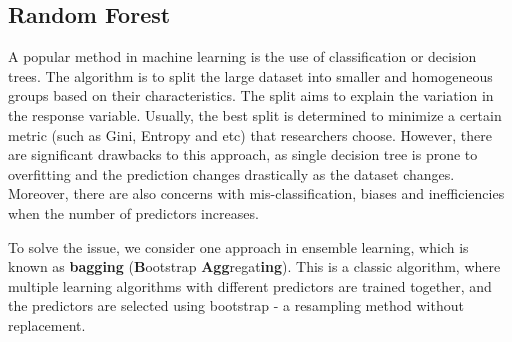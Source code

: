 \documentclass[oneside, 12pt]{article}
\newcommand*{\1}{\text{\scalebox{1.1}{\usefont{U}{bbold}{m}{n}1}}}
\begin{document}
\subsection{Random Forest}
A popular method in machine learning is the use of classification or decision trees. The algorithm is to split the large dataset into smaller and homogeneous groups based on their characteristics. The split aims to explain the variation in the response variable. Usually, the best split is determined to minimize a certain metric (such as Gini, Entropy and etc) that researchers choose. However, there are significant drawbacks to this approach, as single decision tree is prone to overfitting and the prediction changes drastically as the dataset changes. Moreover, there are also concerns with mis-classification, biases and inefficiencies when the number of predictors increases. \newline

To solve the issue, we consider one approach in ensemble learning, which is known as \textbf{bagging} (\textbf{B}ootstrap \textbf{Agg}regat\textbf{ing}). This is a classic algorithm, where multiple learning algorithms with different predictors are trained together, and the predictors are selected using bootstrap - a resampling method without replacement.
\end{document}
